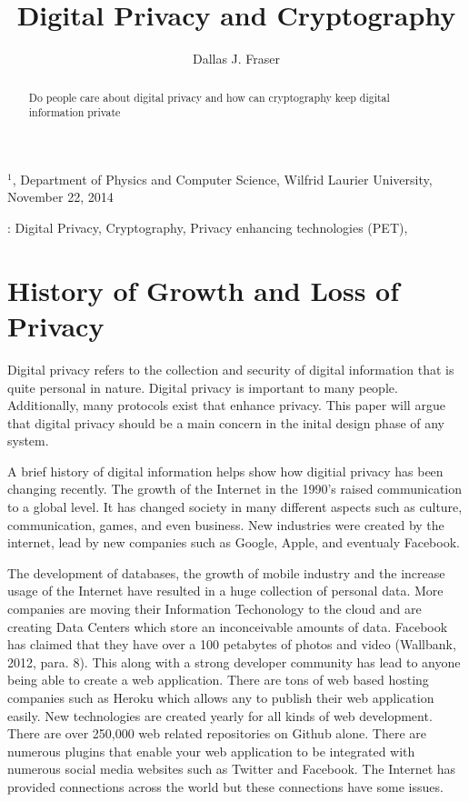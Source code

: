 \documentclass[12pt]{article}
\title{Digital Privacy and Cryptography}
\author{
	Dallas J. Fraser\inst{1}
}
\def\inst#1{$^{#1}$}
\begin{document}
\maketitle

\begin{center}
{\footnotesize

\inst{1}, Department of Physics and Computer Science, Wilfrid Laurier 
University, November 22, 2014}

\end{center}

\begin{abstract}
Do people care about digital privacy and how can cryptography keep digital information private
\end{abstract}

: Digital Privacy, Cryptography, Privacy enhancing technologies (PET),

\clearpage

\section{History of Growth and Loss of Privacy}\label{sec:history}

Digital privacy refers to the collection and security of digital information that is quite personal in nature. Digital privacy is important to many people. Additionally, many protocols exist that enhance privacy. This paper will argue that digital privacy should be a main concern in the inital design phase of any system. 

A brief history of digital information helps show how digitial privacy has been changing recently. The growth of the Internet in the 1990's raised communication to a global level. It has changed society in many different aspects such as culture, communication, games, and even business. New industries were created by the internet, lead by new companies such as Google, Apple, and eventualy Facebook.

The development of databases, the growth of mobile industry  and the increase usage of the Internet have resulted in a huge collection of personal data. More companies are moving their Information Techonology to the cloud and are creating Data Centers which store an inconceivable amounts of data. Facebook has claimed that they have over a 100 petabytes of photos and video (Wallbank, 2012, para. 8). This along with a strong developer community has lead to anyone being able to create a web application. There are tons of web based hosting companies such as Heroku which allows any to publish their web application easily. New technologies are created yearly for all kinds of web development. There are over 250,000 web related repositories on Github alone. There are numerous plugins that enable your web application to be integrated with numerous social media websites such as Twitter and Facebook. The Internet has provided connections across the world but these connections have some issues.
\end{document}
